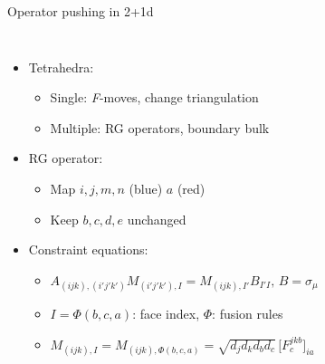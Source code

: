 \documentclass{fdubeamer}
\begin{document}
\begin{frame}{Operator pushing in 2+1d}

\begin{columns}[c]


    \begin{itemize}
      \item Tetrahedra:

        \begin{itemize}
          \item Single: \textit{F}-moves, change triangulation
          \item Multiple: RG operators, boundary \textrightarrow{} bulk
        \end{itemize}

      \item RG operator:

        \begin{itemize}
          \item Map $i,j,m,n$ (blue) \textrightarrow{} $a$ (red)
          \item Keep $b,c,d,e$ unchanged
        \end{itemize}

      \item Constraint equations:

        \begin{itemize}
          \item $A_{(ijk), (i'j'k')} M_{(i'j'k'), I} = M_{(ijk), I'} B_{I'I}, \, B=\sigma_\mu$ \\[0.5ex]
          \item $I=\Phi(b,c,a)$: face index, $\Phi$: fusion rules
          \item $M_{(ijk), I} = M_{(ijk), \Phi(b,c,a)} = \sqrt{d_j d_k d_b d_c} \, \bigl[ F^{jkb}_c \bigr]_{ia}$
        \end{itemize}
    \end{itemize}


    \begin{center}
      \scriptsize
      \tikzset{x=1em, y=1em, node font=\tiny}
       \\[1ex]
       \\[1ex]
       \quad
    \end{center}

\end{columns}


\end{frame}
\end{document}
